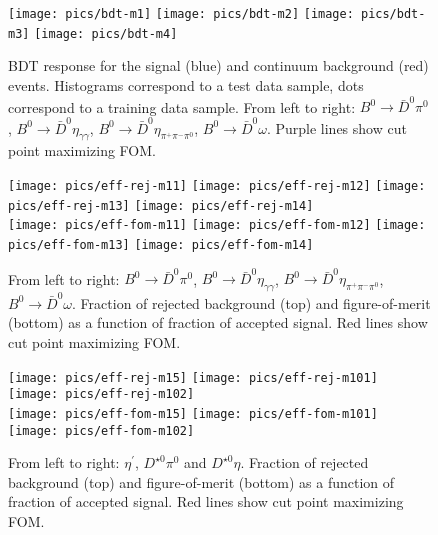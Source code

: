 \documentclass[preprint,aps,showpacs]{revtex4}
\newcommand{\bdpi}{\ensuremath{B^0\to \bar D^0\pi^0}\xspace}
\newcommand{\bdetagg}{\ensuremath{B^0\to \bar D^0\eta_{\gamma\gamma}}\xspace}
\newcommand{\bdetappp}{\ensuremath{B^0\to \bar D^0\eta_{\pi^+\pi^-\pi^0}}\xspace}
\newcommand{\bdomega}{\ensuremath{B^0\to \bar D^0\omega}\xspace}
\begin{document}
\begin{figure}[htb]
\texttt{[image: pics/bdt-m1]}
\texttt{[image: pics/bdt-m2]}
\texttt{[image: pics/bdt-m3]}
\texttt{[image: pics/bdt-m4]}\\
\caption{BDT response for the signal (blue) and continuum background (red) events. Histograms correspond to a test data sample, dots correspond to a training data sample. From left to right: \bdpi, \bdetagg, \bdetappp, \bdomega. Purple lines show cut point maximizing FOM.}
\label{fig:bdt-response}
\end{figure}
\begin{figure}[htb]
\texttt{[image: pics/eff-rej-m11]}
\texttt{[image: pics/eff-rej-m12]}
\texttt{[image: pics/eff-rej-m13]}
\texttt{[image: pics/eff-rej-m14]}\\
\texttt{[image: pics/eff-fom-m11]}
\texttt{[image: pics/eff-fom-m12]}
\texttt{[image: pics/eff-fom-m13]}
\texttt{[image: pics/eff-fom-m14]}\\
\caption{From left to right: \bdpi, \bdetagg, \bdetappp, \bdomega. Fraction of rejected background (top) and figure-of-merit (bottom) as a function of fraction of accepted signal. Red lines show cut point maximizing FOM.}
\label{fig:bdt-fom}
\end{figure}

\begin{figure}[htb]
\texttt{[image: pics/eff-rej-m15]}
\texttt{[image: pics/eff-rej-m101]}
\texttt{[image: pics/eff-rej-m102]}\\
\texttt{[image: pics/eff-fom-m15]}
\texttt{[image: pics/eff-fom-m101]}
\texttt{[image: pics/eff-fom-m102]}\\
\caption{From left to right: $\eta^{\prime}$, $D^{\star0}\pi^0$ and $D^{\star0}\eta$. Fraction of rejected background (top) and figure-of-merit (bottom) as a function of fraction of accepted signal. Red lines show cut point maximizing FOM.}
\label{fig:lh0-fom}
\end{figure}
\end{document}
